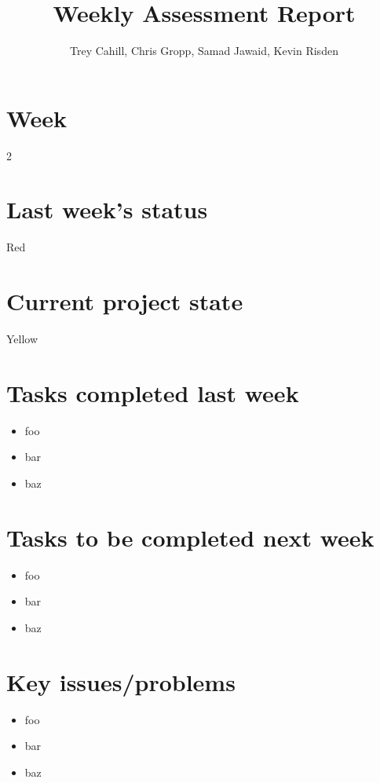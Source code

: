 \documentclass{article}
\title{Weekly Assessment Report}
\author{Trey Cahill, Chris Gropp, Samad Jawaid, Kevin Risden}
\begin{document}
\maketitle
\section{Week}
2
\section{Last week's status}
Red
\section{Current project state}
Yellow
\section{Tasks completed last week}
\begin{itemize}
\item foo
\item bar
\item baz
\end{itemize}
\section{Tasks to be completed next week}
\begin{itemize}
\item foo
\item bar
\item baz
\end{itemize}
\section{Key issues/problems}
\begin{itemize}
\item foo
\item bar
\item baz
\end{itemize}
\end{document}
